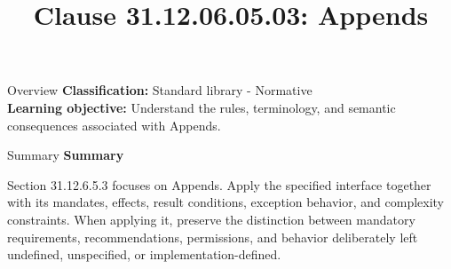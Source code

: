\documentclass[10pt,letterpaper]{article}
\title{Clause 31.12.06.05.03: Appends}
\author{}
\date{}
\begin{document}
\maketitle
\begin{CornellOverviewBox}{Overview}
\textbf{Classification:} Standard library - Normative\\[2pt]
\textbf{Learning objective:} Understand the rules, terminology, and semantic consequences associated with Appends.
\end{CornellOverviewBox}\begin{CornellSummaryBox}{Summary}
{\sffamily\bfseries\color{Accent} Summary}\par\vspace{3pt}Section 31.12.6.5.3 focuses on Appends. Apply the specified interface together with its mandates, effects, result conditions, exception behavior, and complexity constraints. When applying it, preserve the distinction between mandatory requirements, recommendations, permissions, and behavior deliberately left undefined, unspecified, or implementation-defined.
\end{CornellSummaryBox}
\end{document}
